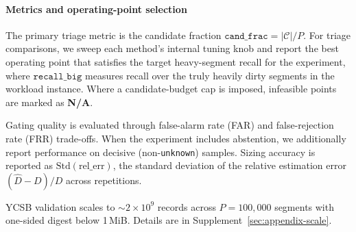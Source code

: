 \paragraph{Metrics and operating-point selection}
The primary triage metric is the candidate fraction
$\mathtt{cand\_frac}{=}|\mathcal{C}|/P$.
For triage comparisons, we sweep each method's internal tuning
knob and report the best operating point that satisfies the
target heavy-segment recall for the experiment, where
$\mathtt{recall\_big}$ measures recall over the truly heavily
dirty segments in the workload instance. Where a candidate-budget
cap is imposed, infeasible points are marked as \textbf{N/A}.

Gating quality is evaluated through false-alarm rate (FAR) and false-rejection rate (FRR) trade-offs. When
the experiment includes abstention, we additionally report
performance on decisive (non-\texttt{unknown}) samples.
Sizing accuracy is reported as $\mathrm{Std(rel\_err)}$, the
standard deviation of the relative estimation error
$(\hat{D}-D)/D$ across repetitions.

YCSB validation scales to ${\sim}2{\times}10^9$ records across
$P{=}100{,}000$ segments with one-sided digest below 1\,MiB. Details are in
Supplement~\ref{sec:appendix-scale}.
